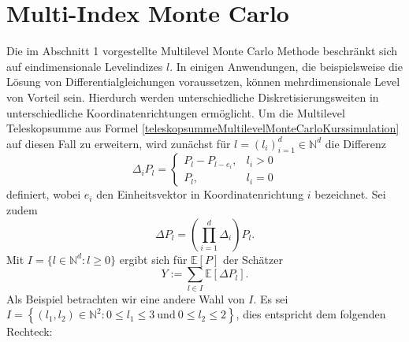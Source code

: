 \documentclass[10pt,a4paper]{article}
\begin{document}
\section{Multi-Index Monte Carlo}

Die im Abschnitt 1 vorgestellte Multilevel Monte Carlo Methode beschränkt sich auf eindimensionale Levelindizes $l$. In einigen Anwendungen, die beispielsweise die Lösung von Differentialgleichungen voraussetzen, können mehrdimensionale Level von Vorteil sein. Hierdurch werden unterschiedliche Diskretisierungsweiten in unterschiedliche Koordinatenrichtungen ermöglicht.
\newline
Um die Multilevel Teleskopsumme aus Formel \eqref{teleskopsummeMultilevelMonteCarloKurssimulation} auf diesen Fall zu erweitern, wird zunächst für $l=(l_i)_{i=1}^d\in\mathbb{N}^d$ die Differenz
\[
	\Delta_iP_l=
	\begin{cases}
		P_l-P_{l-e_i}, & l_i>0\\P_l, & l_i=0
	\end{cases}
\]
definiert, wobei $e_i$ den Einheitsvektor in Koordinatenrichtung $i$ bezeichnet.
\newline
Sei zudem
\[
	\Delta P_l=\left(\prod\limits_{i=1}^d\Delta_i\right)P_l.
\]
Mit $I=\{l\in\mathbb{N}^d:l\geq 0\}$ ergibt sich für $\mathbb{E}[P]$ der Schätzer
\[
	Y:=\sum\limits_{l\in I}\mathbb{E}[\Delta P_l].
\]
Als Beispiel betrachten wir eine andere Wahl von $I$. Es sei $I=\left\{(l_1,l_2)\in\mathbb{N}^2:0\leq l_1\leq 3\ \text{und}\ 0\leq l_2\leq 2\right\}$, dies entspricht dem folgenden Rechteck:
\newline
\end{document}
